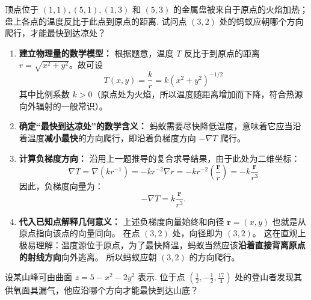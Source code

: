 \documentclass[lang=cn,11pt]{elegantbook}
\begin{document}
\begin{exercise}[温度场的方向寻优实际应用]
顶点位于 $(1,1),(5,1),(1,3)$ 和 $(5,3)$ 的金属盘被来自于原点的火焰加热；盘上各点的温度反比于此点到原点的距离. 试问点 $(3,2)$ 处的蚂蚁应朝哪个方向爬行，才能最快到达凉处？
\end{exercise}
\begin{solution}
\begin{enumerate}
  \item \textbf{建立物理量的数学模型：}
  根据题意，温度 $T$ 反比于到原点的距离 $r = \sqrt{x^2+y^2}$。故可设
  \[ T(x,y) = \frac{k}{r} = k(x^2+y^2)^{-1/2} \]
  其中比例系数 $k > 0$（原点处为火焰，所以温度随距离增加而下降，符合热源向外辐射的一般常识）。

  \item \textbf{确定“最快到达凉处”的数学含义：}
  蚂蚁需要尽快降低温度，意味着它应当沿着温度\textbf{减小最快}的方向爬行，即沿着负梯度方向 $-\nabla T$ 爬行。

  \item \textbf{计算负梯度方向：}
  沿用上一题推导的复合求导结果，由于此处为二维坐标：
  \[ \nabla T = \nabla(k r^{-1}) = -k r^{-2} \nabla r = -k r^{-2} \left(\frac{\boldsymbol{r}}{r}\right) = -k\frac{\boldsymbol{r}}{r^3} \]
  因此，负梯度向量为：
  \[ -\nabla T = k\frac{\boldsymbol{r}}{r^3}. \]
  
  \item \textbf{代入已知点解释几何意义：}
  上述负梯度向量始终和向径 $\boldsymbol{r} = (x,y)$ 也就是从原点指向该点的向量同向。
  在点 $(3,2)$ 处，向径即为 $(3,2)$。
  这在直观上极易理解：温度源位于原点，为了最快降温，蚂蚁当然应该\textbf{沿着直接背离原点的射线方向}向外逃离。
  所以蚂蚁应朝 \textbf{$(3,2)$} 的方向爬行。
\end{enumerate}
\end{solution}

\begin{exercise}[曲面高程函数的最速下降]
设某山峰可由曲面 $z=5-x^2-2y^2$ 表示. 位于点 $\left(\frac{1}{2},-\frac{1}{2},\frac{17}{4}\right)$ 处的登山者发现其供氧面具漏气，他应沿哪个方向才能最快到达山底？
\end{exercise}
\end{document}
